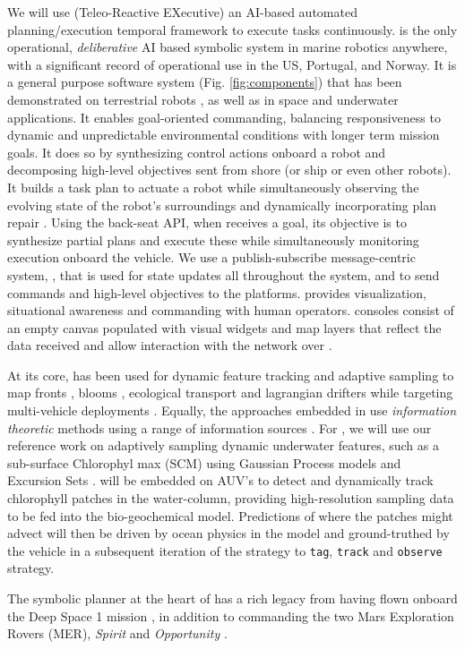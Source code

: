 We will use \rx (Teleo-Reactive EXecutive) an AI-based automated
planning/execution temporal framework to execute tasks
continuously. \rx is the only operational, \emph{deliberative} AI
based symbolic system in marine robotics anywhere, with a significant
record of operational use in the US, Portugal, and Norway. It is a
general purpose software system (Fig. \ref{fig:components}) that has
been demonstrated on terrestrial robots \cite{Meeussen10}, as well as
in space and underwater applications. It enables goal-oriented
commanding, balancing responsiveness to dynamic and unpredictable
environmental conditions with longer term mission goals. It does so by
synthesizing control actions onboard a robot and decomposing
high-level objectives sent from shore (or ship or even other
robots). It builds a task plan to actuate a robot while simultaneously
observing the evolving state of the robot's surroundings and
dynamically incorporating plan repair \cite{py10,rajan12,rajan12b}.
Using the back-seat API, when \rx receives a goal, its objective is to
synthesize partial plans and execute these while simultaneously
monitoring execution onboard the vehicle. We use a publish-subscribe
message-centric system, \imc \cite{imc2009}, that is used for state
updates all throughout the system, and to send commands and high-level
objectives to the platforms. \nep provides visualization, situational
awareness and commanding with human operators. \nep consoles consist
of an empty canvas populated with visual widgets and map layers that
reflect the data received and allow interaction with the network over
\imce.  

At its core, \rx has been used for dynamic feature tracking and
adaptive sampling to map fronts \cite{fronts11,smith14}, blooms
\cite{Das-2010-637}, ecological transport \cite{jdas12,jdas13} and
lagrangian drifters \cite{das10,das11a} while targeting multi-vehicle
deployments \cite{das11,Ferreira2018,pinto20}. Equally, the approaches
embedded in \rx use \emph{information theoretic} methods using a range
of information sources
\cite{Das-2010-637,fronts11,olaya12,jdas12,jdas13,das15,fossum18,fossum19,fossum19b,fossum21}.
For \proj, we will use our reference work on adaptively sampling
dynamic underwater features, such as a sub-surface Chlorophyl max
(SCM) using Gaussian Process models \cite{fossum19} and Excursion Sets
\cite{fossum21}. \rx will be embedded on AUV's to detect and
dynamically track chlorophyll patches in the water-column, providing
high-resolution sampling data to be fed into the bio-geochemical
model. Predictions of where the patches might advect will then be
driven by ocean physics in the model and ground-truthed by the vehicle
in a subsequent iteration of the strategy to \texttt{tag},
\texttt{track} and \texttt{observe} strategy.

The symbolic planner at the heart of \rx has a rich legacy from \nas
having flown onboard the Deep Space 1 mission
\cite{rajan00,jonsson00}, in addition to commanding the two Mars
Exploration Rovers (MER), \emph{Spirit} and \emph{Opportunity}
\cite{aichang04,bresina05}.


